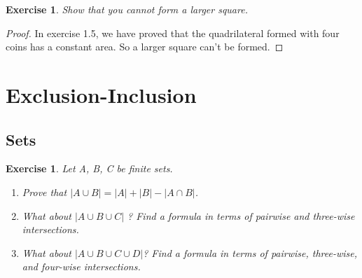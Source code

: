 \documentclass[12pt,a4]{article}
\theoremstyle{exercise}
\newtheorem{exercise}[theorem]{Exercise}
\begin{document}
\begin{exercise}
    Show that you cannot form a larger square.
\end{exercise}

\begin{proof}
    In exercise 1.5, we have proved that the quadrilateral formed with four coins has a constant area.
    So a larger square can't be formed.
\end{proof}

\section{Exclusion-Inclusion}

\subsection{Sets}

\begin{exercise}
Let A, B, C be ﬁnite sets.
\begin{enumerate}

\item Prove that $\left\vert{A \cup B}\right\vert =  \left\vert{A}\right\vert + \left\vert{B}\right\vert - \left\vert{A\cap B}\right\vert$.
\item What about $\left\vert{A\cup B\cup C}\right\vert$ ? Find a formula in terms of pairwise and three-wise intersections.

\item What about $\left\vert{A\cup B\cup C \cup D}\right\vert$? Find a formula in terms of pairwise, three-wise, and four-wise intersections.
\end{enumerate}
\end{exercise}
\end{document}
